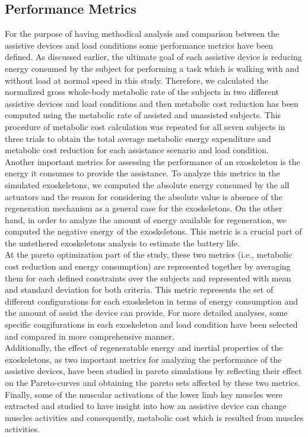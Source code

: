 \documentclass[10pt,letterpaper]{article}
\begin{document}
\subsection*{Performance Metrics}
For the purpose of having methodical analysis and comparison between the assistive devices and load conditions some performance metrics have been defined. As discussed earlier, the ultimate goal of each assistive device is reducing energy consumed by the subject for performing a task which is walking with and without load at normal speed in this study.
Therefore, we calculated the normalized gross whole-body metabolic rate of the subjects in two different assistive devices and load conditions and then metabolic cost reduction has been computed using the metabolic rate of assisted and unassisted subjects. This procedure of metabolic cost calculation was repeated for all seven subjects in three trials to obtain the total average metabolic energy expenditure and metabolic cost reduction for each assistance scenario and load condition.\\
Another important metrics for assessing the performance of an exoskeleton is the energy it consumes to provide the assistance. To analyze this metrics in the simulated exoskeletons, we computed the absolute energy consumed by the all actuators and the reason for considering the absolute value is absence of the regeneration mechanism as a general case for the exoskeletons. On the other hand, in order to analyze the amount of energy available for regeneration, we computed the negative energy of the exoskeletons. This metric is a crucial part of the untethered exoskeletons analysis to estimate the battery life.\\
At the pareto optimization part of the study, these two metrics (i.e., metabolic cost reduction and energy consumption) are represented together by averaging them for each defined constraints over the subjects and represented with mean and standard deviation for both criteria. This metric represents the set of different configurations for each exoskeleton in terms of energy consumption and the amount of assist the device can provide. For more detailed analyses, some specific congifurations in each exoskeleton and load condition have been selected and compared in more comprehensive manner.\\
Additionally, the effect of regeneratable energy and inertial properties of the exoskeletons, as two important metrics for analyzing the performance of the assistive devices, have been studied in pareto simulations by reflecting their effect on the Pareto-curves and obtaining the pareto sets affected by these two metrics.
Finally, some of the muscular activations of the lower limb key muscles were extracted and studied to have insight into how an assistive device can change muscles activities and consequently, metabolic cost which is resulted from muscles activities.
\end{document}
